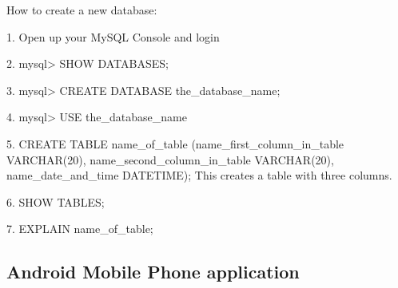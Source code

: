 How to create a new database:

1. 	Open up your MySQL Console and login

2. 	mysql> SHOW DATABASES;

3. 	mysql> CREATE DATABASE the_database_name;

4. 	mysql> USE the_database_name

5. 	CREATE TABLE name_of_table (name_first_column_in_table VARCHAR(20), name_second_column_in_table VARCHAR(20), name_date_and_time DATETIME);  
	This creates a table with three columns.
	
6. 	SHOW TABLES;

7. 	EXPLAIN name_of_table;

\subsection{Android Mobile Phone application}


